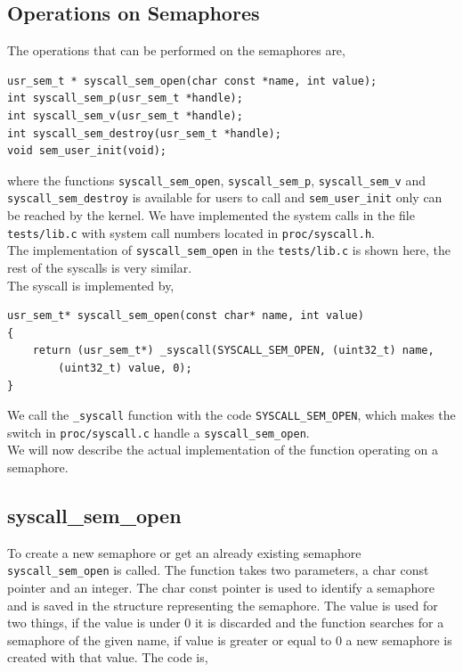 \documentclass[11pt]{article}
\begin{document}
    \subsection{Operations on Semaphores}
    The operations that can be performed on the semaphores are,

    \begin{lstlisting}[style=customc]
usr_sem_t * syscall_sem_open(char const *name, int value);
int syscall_sem_p(usr_sem_t *handle);
int syscall_sem_v(usr_sem_t *handle);
int syscall_sem_destroy(usr_sem_t *handle);
void sem_user_init(void);
    \end{lstlisting}

    where the functions \texttt{syscall\_sem\_open}, \texttt{syscall\_sem\_p},
    \texttt{syscall\_sem\_v} and \\ \texttt{syscall\_sem\_destroy} is available for
    users to call and \texttt{sem\_user\_init} only can be reached by the
    kernel.  We have implemented the system calls in the file
    \texttt{tests/lib.c} with system call numbers located in
    \texttt{proc/syscall.h}. \\ The implementation of \texttt{syscall\_sem\_open}
    in the \texttt{tests/lib.c} is shown here, the rest of the syscalls is very
    similar. \\

    The syscall is implemented by,

    \begin{lstlisting}[style=customc]
usr_sem_t* syscall_sem_open(const char* name, int value)
{
    return (usr_sem_t*) _syscall(SYSCALL_SEM_OPEN, (uint32_t) name,
        (uint32_t) value, 0);
}
    \end{lstlisting}

    We call the \texttt{\_syscall} function with the code
    \texttt{SYSCALL\_SEM\_OPEN}, which makes the switch in
    \texttt{proc/syscall.c} handle a \texttt{syscall\_sem\_open}. \\

    We will now describe the actual implementation of the function operating on
    a semaphore.

    \subsection{syscall\_sem\_open}
    To create a new semaphore or get an already existing semaphore
    \texttt{syscall\_sem\_open} is called.  The function takes two parameters,
    a char const pointer and an integer.  The char const pointer is used to
    identify a semaphore and is saved in the structure representing the
    semaphore.  The value is used for two things, if the value is under 0 it is
    discarded and the function searches for a semaphore of the given name, if
    value is greater or equal to 0 a new semaphore is created with that value.
    The code is,
\end{document}
